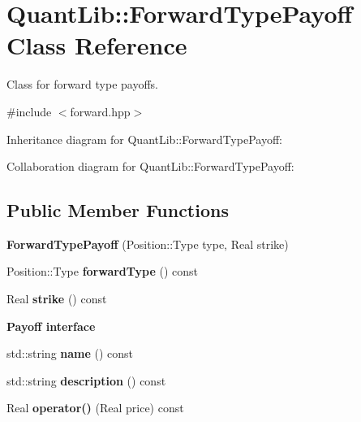 \section{Quant\+Lib\+:\+:Forward\+Type\+Payoff Class Reference}
\label{class_quant_lib_1_1_forward_type_payoff}


Class for forward type payoffs.  




{\ttfamily \#include $<$forward.\+hpp$>$}



Inheritance diagram for Quant\+Lib\+:\+:Forward\+Type\+Payoff\+:


Collaboration diagram for Quant\+Lib\+:\+:Forward\+Type\+Payoff\+:
\subsection*{Public Member Functions}
\begin{DoxyCompactItemize}
\item 
{\bfseries Forward\+Type\+Payoff} (Position\+::\+Type type, Real strike)\label{class_quant_lib_1_1_forward_type_payoff_ad53d18b7642e9826d32878e202d755f5}

\item 
Position\+::\+Type {\bfseries forward\+Type} () const \label{class_quant_lib_1_1_forward_type_payoff_a70a99f0aa06a1e6232fda2ca81380cbf}

\item 
Real {\bfseries strike} () const \label{class_quant_lib_1_1_forward_type_payoff_a4530707bbc45cdbc371ce20bcd2655a6}

\end{DoxyCompactItemize}
\begin{Indent}{\bf Payoff interface}\par
\begin{DoxyCompactItemize}
\item 
std\+::string {\bfseries name} () const \label{class_quant_lib_1_1_forward_type_payoff_a11f8be3f3d895bd59efe27f0cad84c8c}

\item 
std\+::string {\bfseries description} () const \label{class_quant_lib_1_1_forward_type_payoff_afabd17b5638c67d20234632f75735987}

\item 
Real {\bfseries operator()} (Real price) const \label{class_quant_lib_1_1_forward_type_payoff_a006d2b80d670c1db7c599f808f956405}

\end{DoxyCompactItemize}
\end{Indent}
